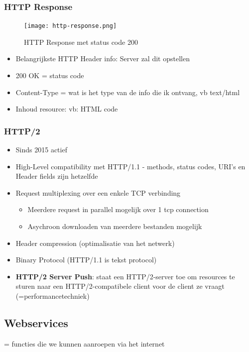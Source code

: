 \documentclass{article}
\newcommand{\bold}[1]{\textbf{#1}}
\begin{document}
\subsubsection{HTTP Response}
\begin{figure}[H]
    \centering
    \texttt{[image: http-response.png]}
    \caption{HTTP Response met status code 200}
\end{figure}

\begin{itemize}
    \item Belangrijkste HTTP Header info: Server zal dit opstellen
    \item 200 OK = status code
    \item Content-Type = wat is het type van de info die ik ontvang, vb text/html
    \item Inhoud resource: vb: HTML code
\end{itemize}

\subsubsection{HTTP/2}

\begin{itemize}
    \item Sinds 2015 actief
    \item High-Level compatibility met HTTP/1.1 - methods, status codes, URI's en Header fields zijn hetzelfde
    \item Request multiplexing over een enkele TCP verbinding
    \begin{itemize}
        \item Meerdere request in parallel mogelijk over 1 tcp connection
        \item Asychroon downloaden van meerdere bestanden mogelijk
    \end{itemize}
    \item Header compression (optimalisatie van het netwerk)
    \item Binary Protocol (HTTP/1.1 is tekst protocol)
    \item \bold{HTTP/2 Server Push}: staat een HTTP/2-server toe om resources te sturen naar een HTTP/2-compatibele client voor de client ze vraagt (=performancetechniek)
\end{itemize}


\subsection{Webservices}
= functies die we kunnen aanroepen via het internet
\end{document}
